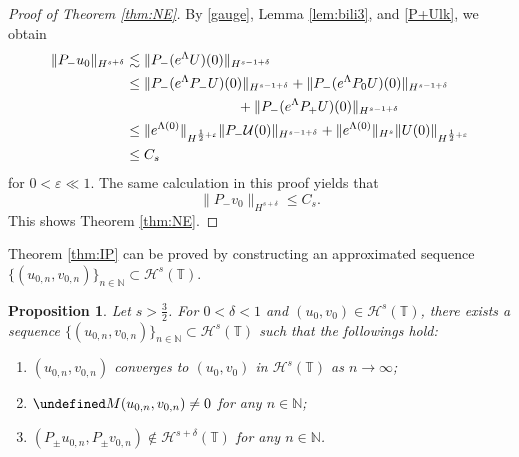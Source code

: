 \documentclass[%
11pt,  reqno]{amsart}
\newtheorem{proposition}[theorem]{Proposition}
\newcommand{\T}{\mathbb{T}}
\newcommand{\N}{\mathbb{N}}
\newcommand{\Ul}{\mathcal U}
\renewcommand{\H}{\mathcal H}
\newcommand{\dl}{\delta}
\newcommand{\eps}{\varepsilon}
\newcommand{\Ld}{\Lambda}
\newcommand{\les}{\lesssim}
\numberwithin{equation}{section}
\numberwithin{theorem}{section}
\let\Im=\undefined\DeclareMathOperator*{\Im}{Im}
\begin{document}
\begin{proof}[Proof of Theorem \ref{thm:NE}]
By \eqref{gauge}, Lemma \ref{lem:bili3},
and \eqref{P+Ulk}, we obtain
\begin{equation*}
\begin{aligned}
\| P_- u_0 \|_{H^{s+\dl}}
&\les
\| P_- (e^{\Ld} U)(0) \|_{H^{s-1+\dl}}
\\
&\le
\| P_- (e^{\Ld} P_- U)(0) \|_{H^{s-1+\dl}}
+ 
\| P_- (e^{\Ld} P_0 U)(0) \|_{H^{s-1+\dl}}
\\
&\hspace*{80pt}+
\| P_- (e^{\Ld} P_+ U)(0) \|_{H^{s-1+\dl}}
\\
&\le
\| e^{\Ld(0)} \|_{H^{\frac 12+ \eps}} \| P_- \Ul (0)\|_{H^{s-1+\dl}}
+
\| e^{\Ld(0)} \|_{H^s} \| U(0) \|_{H^{\frac 12+\eps}}
\\
&\le
C_s
\end{aligned}
\end{equation*}
for $0 < \eps \ll 1$.
The same calculation in this proof yields that
\[
\| P_- v_0 \|_{H^{s+\dl}} \le C_s.
\]
This shows Theorem \ref{thm:NE}.
\end{proof}

Theorem \ref{thm:IP} can be proved by constructing 
an approximated sequence $\{(u_{0,n}, v_{0,n})\}_{n \in \N} \subset \H^s(\T)$.


\begin{proposition}
\label{prop:app} 
Let $s > \frac 32$. For $0<\dl<1$ and $(u_0, v_0) \in \H^s(\T)$, there exists a sequence
$\{(u_{0,n}, v_{0,n})\}_{n \in \N} \subset \H^s(\T)$ such that the followings hold:
\begin{enumerate}
\item $(u_{0,n}, v_{0,n})$ converges to $(u_0, v_0)$ in $\H^s(\T)$ as $n \to \infty$;
\item $\Im M (u_{0, n}, v_{0, n}) \neq 0$ for any $n \in \N$;
\item $(P_\pm u_{0,n}, P_\pm v_{0,n}) \notin \H^{s+\dl}(\T)$ for any $n \in \N$.
\end{enumerate}
\end{proposition}
\end{document}
